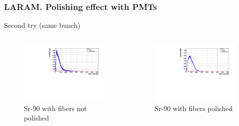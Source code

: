 \documentclass{beamer}
\begin{document}
\begin{frame}
\frametitle{LARAM. Polishing effect with PMTs}
Second try (same bunch)

\begin{columns}

\begin{figure}[hbtp]
\centering
\includegraphics[scale=0.3]{LARAM/Polishing_effect/Second_try/No_polished/Sr_90_no_polished.pdf}
\caption{Sr-90 with fibers not polished}
\end{figure}


\begin{figure}[hbtp]
\centering
\includegraphics[scale=0.3]{LARAM/Polishing_effect/Second_try/Polished/Sr_90_polished.pdf}
\caption{Sr-90 with fibers polished}
\end{figure}

\end{columns}

\end{frame}
\end{document}
